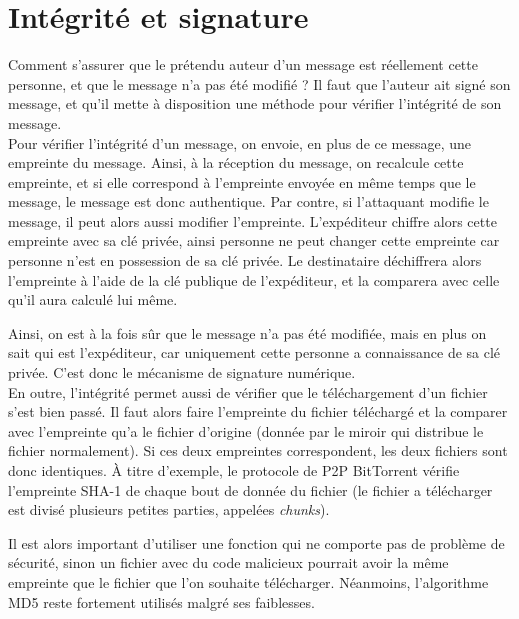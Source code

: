 
\section{Intégrité et signature}
Comment s'assurer que le prétendu auteur d'un message est
réellement cette personne, et que le message n'a pas été modifié ?
Il faut que l'auteur ait signé son message, et qu'il mette à
disposition une méthode pour vérifier l'intégrité de son message.
\\

Pour vérifier l'intégrité d'un message, on envoie, en plus de ce
message, une empreinte du message. Ainsi, à la réception du
message, on recalcule cette empreinte, et si elle correspond à
l'empreinte envoyée en même temps que le message, le message est
donc authentique. Par contre, si l'attaquant modifie le message,
il peut alors aussi modifier l'empreinte. L'expéditeur chiffre
alors cette empreinte avec sa clé privée, ainsi personne ne peut
changer cette empreinte car personne n'est en possession de sa clé
privée. Le destinataire déchiffrera alors l'empreinte à l'aide de
la clé publique de l'expéditeur, et la comparera avec celle qu'il
aura calculé lui même.

Ainsi, on est à la fois sûr que le message n'a pas été modifiée,
mais en plus on sait qui est l'expéditeur, car uniquement cette
personne a connaissance de sa clé privée. C'est donc le mécanisme
de signature numérique.
\\

En outre, l'intégrité permet aussi de vérifier que le
téléchargement d'un fichier s'est bien passé. Il faut alors faire
l'empreinte du fichier téléchargé et la comparer avec l'empreinte
qu'a le fichier d'origine (donnée par le miroir qui distribue le
fichier normalement). Si ces deux empreintes correspondent, les
deux fichiers sont donc identiques. À titre d'exemple, le protocole
de P2P BitTorrent vérifie l'empreinte SHA-1 de chaque bout de donnée
du fichier 
(le fichier a télécharger est divisé plusieurs petites parties, 
appelées \emph{chunks}).  

Il est alors important d'utiliser une fonction qui ne comporte pas
de problème de sécurité, sinon un fichier avec du code malicieux
pourrait avoir la même empreinte que le fichier que l'on souhaite
télécharger. Néanmoins, l'algorithme MD5 reste fortement utilisés
malgré ses faiblesses.

